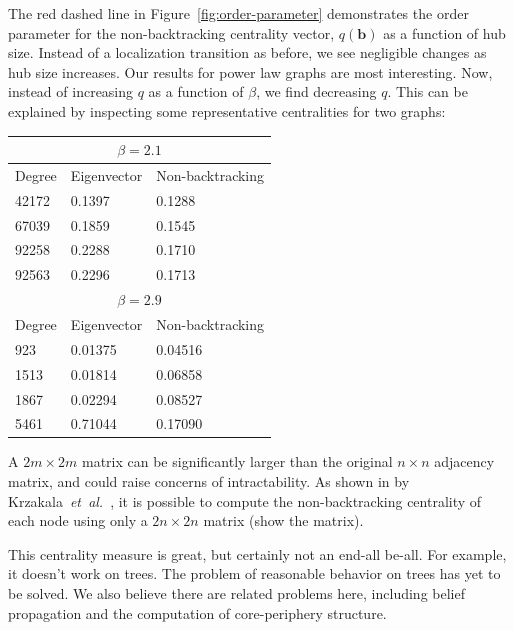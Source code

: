\documentclass[twocolumn,prl,superscriptaddress]{revtex4}
\newcommand{\etal}{{\it{}et~al.}}
\renewcommand{\vec}{\mathbf}
\begin{document}
The red dashed line in Figure~\ref{fig:order-parameter} demonstrates the order parameter for the non-backtracking centrality vector, $q(\vec{b})$ as a function of hub size. Instead of a localization transition as before, we see negligible changes as hub size increases. Our results for power law graphs are most interesting. Now, instead of increasing $q$ as a function of $\beta$, we find decreasing $q$. This can be explained by inspecting some representative centralities for two graphs:

\begin{table}
\centering
\begin{tabular}{|l|l|l|} \hline
\multicolumn{3}{|c|}{$\beta=2.1$} \\ \hline
Degree & Eigenvector & Non-backtracking \\ \hline
42172 & 0.1397 & 0.1288 \\ \hline
67039 & 0.1859 & 0.1545 \\ \hline
92258 & 0.2288 & 0.1710 \\ \hline
92563 & 0.2296 & 0.1713 \\ \hline \hline
\multicolumn{3}{|c|}{$\beta=2.9$} \\ \hline 
Degree & Eigenvector & Non-backtracking \\ \hline
923  & 0.01375 & 0.04516 \\ \hline
1513 & 0.01814 & 0.06858 \\ \hline
1867 & 0.02294 & 0.08527 \\ \hline
5461 & 0.71044 & 0.17090 \\ \hline
\end{tabular}
\end{table}



A $2m \times 2m$ matrix can be significantly larger than the original $n \times n$ adjacency matrix, and could raise concerns of intractability. As shown in by Krzakala~\etal~\cite{krzakala13}, it is possible to compute the non-backtracking centrality of each node using only a $2n \times 2n$ matrix (show the matrix).



This centrality measure is great, but certainly not an end-all be-all. For example, it doesn't work on trees. The problem of reasonable behavior on trees has yet to be solved. We also believe there are related problems here, including belief propagation and the computation of core-periphery structure.
\end{document}
